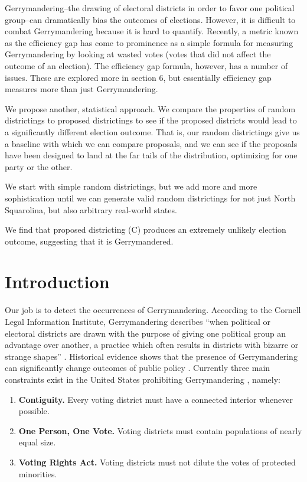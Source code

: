 \documentclass[12pt]{article}
\begin{document}
    Gerrymandering--the drawing of electoral districts in order to favor one political group--can dramatically bias the outcomes of elections. However, it is difficult to combat Gerrymandering because it is hard to quantify. Recently, a metric known as the efficiency gap has come to prominence as a simple formula for measuring Gerrymandering by looking at wasted votes (votes that did not affect the outcome of an election). The efficiency gap formula, however, has a number of issues. These are explored more in section 6, but essentially efficiency gap measures more than just Gerrymandering.
    \par We propose another, statistical approach. We compare the properties of random districtings to proposed districtings to see if the proposed districts would lead to a significantly different election outcome. That is, our random districtings give us a baseline with which we can compare proposals, and we can see if the proposals have been designed to land at the far tails of the distribution, optimizing for one party or the other.
    \par We start with simple random districtings, but we add more and more sophistication until we can generate valid random districtings for not just North Squarolina, but also arbitrary real-world states.
    \par We find that proposed districting (C) produces an extremely unlikely election outcome, suggesting that it is Gerrymandered.

\section{Introduction}
    Our job is to detect the occurrences of Gerrymandering. According to the Cornell Legal Information Institute, Gerrymandering describes ``when political or electoral districts are drawn with the purpose of giving one political group an advantage over another, a practice which often results in districts with bizarre or strange shapes'' \cite{CLLI}. Historical evidence shows that the presence of Gerrymandering can significantly change outcomes of public policy \cite{psmag}. Currently three main constraints exist in the United States prohibiting Gerrymandering \cite{problem}, namely: 
    \begin{enumerate}
    \item \textbf{Contiguity.} Every voting district must have a connected interior whenever possible.
    \item \textbf{One Person, One Vote.} Voting districts must contain populations of nearly equal size.
    \item \textbf{Voting Rights Act.} Voting districts must not dilute the votes of protected minorities.
    \end{enumerate}
\end{document}
